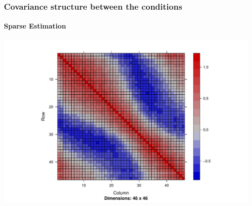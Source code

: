 \begin{frame}[containsverbatim]
\frametitle{Covariance structure between the conditions}
\framesubtitle{Sparse Estimation}

\begin{knitrout}\scriptsize
{}\color{fgcolor}\begin{kframe}
\begin{alltt}
\hlopt{$}
\end{alltt}
\end{kframe}
\includegraphics[width=.8\textwidth]{figures/r_get_plasmodium_glassob-1} 

\end{knitrout}
\end{frame}

